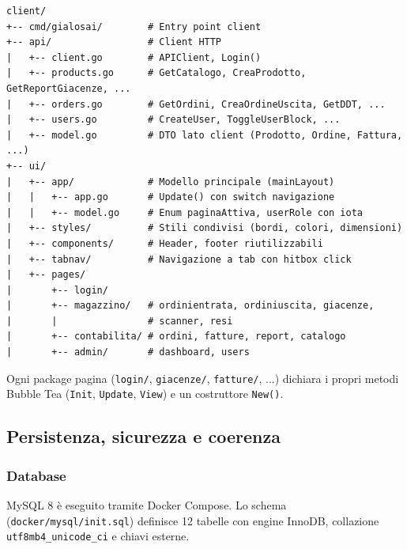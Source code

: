 \documentclass[a4paper,12pt]{article}
\begin{document}
\begin{verbatim}
client/
+-- cmd/gialosai/        # Entry point client
+-- api/                 # Client HTTP
|   +-- client.go        # APIClient, Login()
|   +-- products.go      # GetCatalogo, CreaProdotto, GetReportGiacenze, ...
|   +-- orders.go        # GetOrdini, CreaOrdineUscita, GetDDT, ...
|   +-- users.go         # CreateUser, ToggleUserBlock, ...
|   +-- model.go         # DTO lato client (Prodotto, Ordine, Fattura, ...)
+-- ui/
|   +-- app/             # Modello principale (mainLayout)
|   |   +-- app.go       # Update() con switch navigazione
|   |   +-- model.go     # Enum paginaAttiva, userRole con iota
|   +-- styles/          # Stili condivisi (bordi, colori, dimensioni)
|   +-- components/      # Header, footer riutilizzabili
|   +-- tabnav/          # Navigazione a tab con hitbox click
|   +-- pages/
|       +-- login/
|       +-- magazzino/   # ordinientrata, ordiniuscita, giacenze,
|       |                # scanner, resi
|       +-- contabilita/ # ordini, fatture, report, catalogo
|       +-- admin/       # dashboard, users
\end{verbatim}


Ogni package pagina (\texttt{login/}, \texttt{giacenze/}, \texttt{fatture/}, ...) dichiara i propri metodi Bubble Tea (\texttt{Init}, \texttt{Update}, \texttt{View}) e un costruttore \texttt{New()}.

\subsection{Persistenza, sicurezza e coerenza}

\subsubsection{Database}

MySQL 8 è eseguito tramite Docker Compose. Lo schema (\texttt{docker/mysql/init.sql}) definisce 12 tabelle con engine InnoDB, collazione \texttt{utf8mb4\_unicode\_ci} e chiavi esterne.
\end{document}
